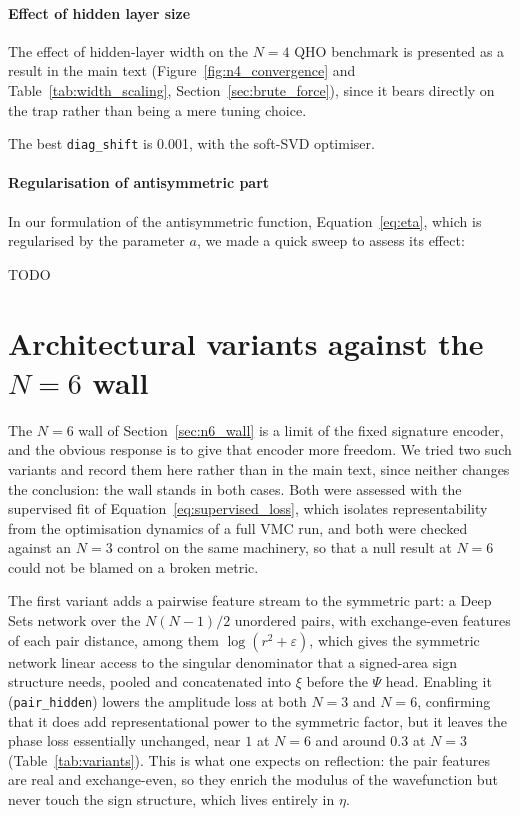 \documentclass[a4paper,11pt,twoside]{article}
\begin{document}
\paragraph{Effect of hidden layer size}

The effect of hidden-layer width on the $N=4$ QHO benchmark is presented as a result in the main text (Figure~\ref{fig:n4_convergence} and Table~\ref{tab:width_scaling}, Section~\ref{sec:brute_force}), since it bears directly on the trap rather than being a mere tuning choice.

The best \texttt{diag\_shift} is 0.001, with the soft-SVD optimiser.
\paragraph{Regularisation of antisymmetric part}

In our formulation of the antisymmetric function, Equation~\ref{eq:eta}, which is regularised by the parameter $a$, we made a quick sweep to assess its effect:

TODO

\section{Architectural variants against the $N=6$ wall}
\label{app:variants}

The $N=6$ wall of Section~\ref{sec:n6_wall} is a limit of the fixed signature encoder, and the obvious response is to give that encoder more freedom. We tried two such variants and record them here rather than in the main text, since neither changes the conclusion: the wall stands in both cases. Both were assessed with the supervised fit of Equation~\ref{eq:supervised_loss}, which isolates representability from the optimisation dynamics of a full VMC run, and both were checked against an $N=3$ control on the same machinery, so that a null result at $N=6$ could not be blamed on a broken metric.

The first variant adds a pairwise feature stream to the symmetric part: a Deep Sets network over the $N(N-1)/2$ unordered pairs, with exchange-even features of each pair distance, among them $\log(r^2 + \varepsilon)$, which gives the symmetric network linear access to the singular denominator that a signed-area sign structure needs, pooled and concatenated into $\xi$ before the $\Psi$ head. Enabling it (\texttt{pair\_hidden}) lowers the amplitude loss at both $N=3$ and $N=6$, confirming that it does add representational power to the symmetric factor, but it leaves the phase loss essentially unchanged, near $1$ at $N=6$ and around $0.3$ at $N=3$ (Table~\ref{tab:variants}). This is what one expects on reflection: the pair features are real and exchange-even, so they enrich the modulus of the wavefunction but never touch the sign structure, which lives entirely in $\eta$.
\end{document}
